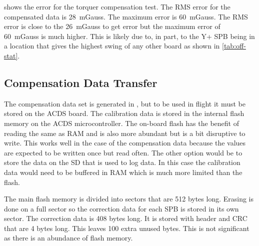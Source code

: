 
 shows the error for the torquer compensation test. The RMS error for the compensated data is 28~mGauss. The maximum error is 60~mGauss. The RMS error is close to the 26~mGauss to get {\textdegree} error but the maximum error of 60~mGauss is much higher. This is likely due to, in part, to the Y+ \ac{SPB} being in a location that gives the highest swing of any other board as shown in \cref{tab:off-stat}.


\subsection{Compensation Data Transfer}

The compensation data set is generated in \matlab, but to be used in flight it must be stored on the \ac{ACDS} board. The calibration data is stored in the internal flash memory on the \ac{ACDS} microcontroller. The on-board flash has the benefit of reading the same as \ac{RAM} and is also more abundant but is a bit disruptive to write. This works well in the case of the compensation data because the values are expected to be written once but read often. The other option would be to store the data on the \ac{SD} that is used to log data. In this case the calibration data would need to be buffered in \ac{RAM} which is much more limited than the flash. 

The main flash memory is divided into sectors that are 512 bytes long. Erasing is done on a full sector so the correction data for each \ac{SPB} is stored in its own sector. The correction data is 408 bytes long. It is stored with header and \ac{CRC} that are 4 bytes long. This leaves 100 extra unused bytes. This is not significant as there is an abundance of flash memory.

